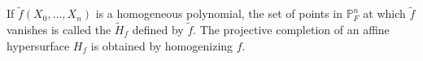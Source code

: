 If $\tilde{f}(X_0,\ldots,X_n)$ is a homogeneous polynomial, the set of points in $\mathbb{P}_F^n$ at which $\tilde{f}$ vanishes is called the  $\tilde{H}_f$ defined by $\tilde{f}$. The projective completion of an affine hypersurface $H_f$ is obtained by homogenizing $f$.